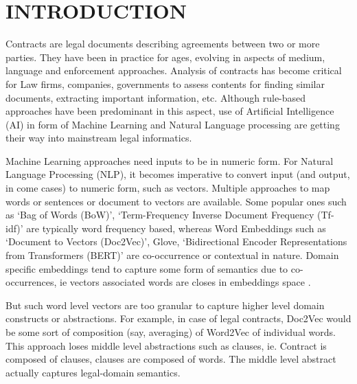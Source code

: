 \documentclass[9pt,academicons]{article}
\begin{document}
%




\section{INTRODUCTION}

Contracts are legal documents describing agreements between two or more parties. They have been in practice for ages, evolving in aspects of medium, language and enforcement approaches. Analysis of contracts has become critical for Law firms, companies, governments to assess contents for finding similar documents, extracting important information, etc. Although rule-based approaches have been predominant in this aspect, use of Artificial Intelligence (AI) in form of Machine Learning and Natural Language processing are getting their way into mainstream legal informatics.

Machine Learning approaches need inputs to be in numeric form. For Natural Language Processing (NLP), it becomes imperative 
to convert input (and output, in come cases) to numeric form, such as vectors. Multiple approaches to map words or sentences or document to vectors are available. Some popular ones such as `Bag of Words (BoW)', `Term-Frequency Inverse Document Frequency (Tf-idf)' are typically word frequency based, whereas Word Embeddings such as `Document to Vectors (Doc2Vec)', Glove, `Bidirectional Encoder Representations from Transformers (BERT)' are co-occurrence or contextual in nature. Domain specific embeddings tend to capture some form of semantics due to co-occurrences, ie vectors associated words are closes in embeddings space \cite{Doc2VecSurvey}.

But such word level vectors are too granular to capture higher level domain constructs or abstractions. For example, in case of legal contracts, Doc2Vec would be some sort of composition (say, averaging) of Word2Vec of individual words. This approach loses middle level abstractions such as clauses, ie. Contract is composed of clauses, clauses are composed of words. The middle level abstract actually captures legal-domain semantics.
\end{document}
